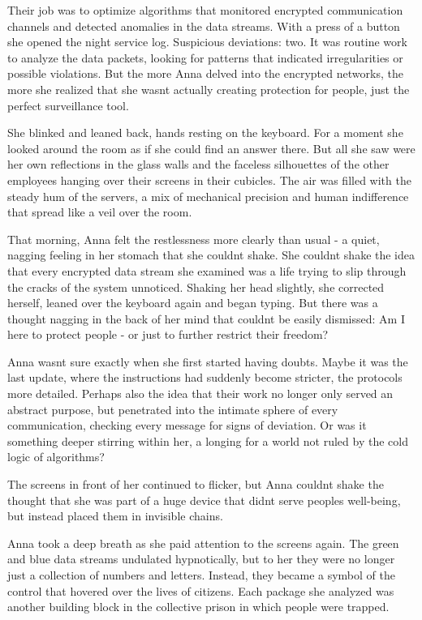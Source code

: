 \documentclass[
]{article}
\begin{document}
Their job was to optimize algorithms that monitored encrypted
communication channels and detected anomalies in the data streams. With
a press of a button she opened the night service log. Suspicious
deviations: two. It was routine work to analyze the data packets,
looking for patterns that indicated irregularities or possible
violations. But the more Anna delved into the encrypted networks, the
more she realized that she wasn\textquotesingle t actually creating
protection for people, just the perfect surveillance tool.

She blinked and leaned back, hands resting on the keyboard. For a moment
she looked around the room as if she could find an answer there. But all
she saw were her own reflections in the glass walls and the faceless
silhouettes of the other employees hanging over their screens in their
cubicles. The air was filled with the steady hum of the servers, a mix
of mechanical precision and human indifference that spread like a veil
over the room.

That morning, Anna felt the restlessness more clearly than usual - a
quiet, nagging feeling in her stomach that she couldn\textquotesingle t
shake. She couldn\textquotesingle t shake the idea that every encrypted
data stream she examined was a life trying to slip through the cracks of
the system unnoticed. Shaking her head slightly, she corrected herself,
leaned over the keyboard again and began typing. But there was a thought
nagging in the back of her mind that couldn\textquotesingle t be easily
dismissed: Am I here to protect people - or just to further restrict
their freedom?

Anna wasn\textquotesingle t sure exactly when she first started having
doubts. Maybe it was the last update, where the instructions had
suddenly become stricter, the protocols more detailed. Perhaps also the
idea that their work no longer only served an abstract purpose, but
penetrated into the intimate sphere of every communication, checking
every message for signs of deviation. Or was it something deeper
stirring within her, a longing for a world not ruled by the cold logic
of algorithms?

The screens in front of her continued to flicker, but Anna
couldn\textquotesingle t shake the thought that she was part of a huge
device that didn\textquotesingle t serve people\textquotesingle s
well-being, but instead placed them in invisible chains.

Anna took a deep breath as she paid attention to the screens again. The
green and blue data streams undulated hypnotically, but to her they were
no longer just a collection of numbers and letters. Instead, they became
a symbol of the control that hovered over the lives of citizens. Each
package she analyzed was another building block in the collective prison
in which people were trapped.
\end{document}
